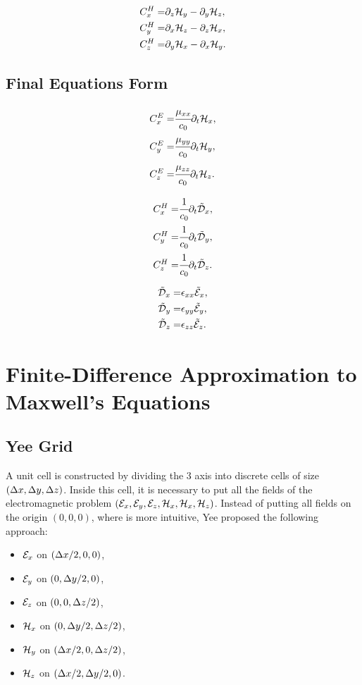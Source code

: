 \begin{eqnarray}
    C_x^H =& \partial_z\mathcal{H}_y - \partial_y\mathcal{H}_z, \\
    C_y^H =& \partial_x\mathcal{H}_z - \partial_z\mathcal{H}_x, \\
    C_z^H =& \partial_y\mathcal{H}_x - \partial_x\mathcal{H}_y.
\end{eqnarray}

\subsection{Final Equations Form}

\begin{eqnarray}
    C_x^E =& \cfrac{\mu_{xx}}{c_0} \partial_t \mathcal{H}_x, \\
    C_y^E =& \cfrac{\mu_{yy}}{c_0} \partial_t \mathcal{H}_y,\\
    C_z^E =& \cfrac{\mu_{zz}}{c_0} \partial_t \mathcal{H}_z.
\end{eqnarray}

\begin{eqnarray}
    C_x^H =& \cfrac{1}{c_0} \partial_t \tilde{\mathcal{D}}_x, \\
    C_y^H =& \cfrac{1}{c_0} \partial_t \tilde{\mathcal{D}}_y, \\
    C_z^H =& \cfrac{1}{c_0} \partial_t \tilde{\mathcal{D}}_z.
\end{eqnarray}

\begin{eqnarray}
    \tilde{\mathcal{D}}_x =& \epsilon_{xx} \tilde{\mathcal{E}}_x, \\
    \tilde{\mathcal{D}}_y =& \epsilon_{yy} \tilde{\mathcal{E}}_y, \\
    \tilde{\mathcal{D}}_z =& \epsilon_{zz} \tilde{\mathcal{E}}_z.
\end{eqnarray}


\section{Finite-Difference Approximation to Maxwell's Equations}

\subsection{Yee Grid}
A unit cell is constructed by dividing the 3 axis into discrete cells of size $(\Delta x, \Delta y, \Delta z)$. Inside this cell, it is necessary to put all the fields of the electromagnetic problem $(\mathcal{E}_x, \mathcal{E}_y, \mathcal{E}_z, \mathcal{H}_x, \mathcal{H}_x, \mathcal{H}_z)$. Instead of putting all fields on the origin $(0, 0, 0)$, where is more intuitive, Yee proposed the following approach:

\begin{itemize}
    \item $\mathcal{E}_x$ on $(\Delta x/2, 0, 0)$,
    \item $\mathcal{E}_y$ on $(0, \Delta y/2, 0)$,
    \item $\mathcal{E}_z$ on $(0, 0, \Delta z/2)$,
    \item $\mathcal{H}_x$ on $(0, \Delta y/2, \Delta z/2)$,
    \item $\mathcal{H}_y$ on $(\Delta x/2, 0, \Delta z/2)$,
    \item $\mathcal{H}_z$ on $(\Delta x/2, \Delta y/2, 0)$.
\end{itemize}

